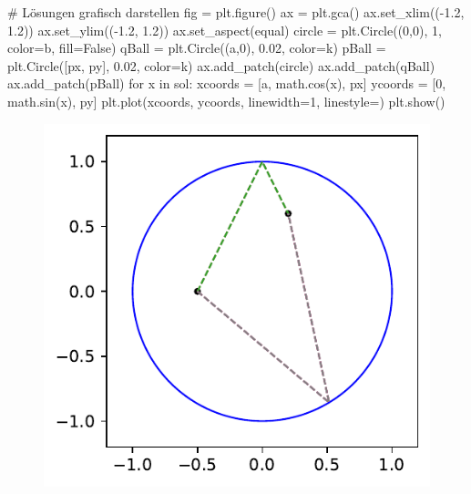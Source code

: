 \documentclass[
  letterpaper,
  DIV=11,
  oneside]{scrreprt}
\newenvironment{Shaded}{\begin{snugshade}}{\end{snugshade}}
\newcommand{\CommentTok}[1]{\textcolor[rgb]{0.37,0.37,0.37}{#1}}
\newcommand{\ControlFlowTok}[1]{\textcolor[rgb]{0.00,0.23,0.31}{#1}}
\newcommand{\DecValTok}[1]{\textcolor[rgb]{0.68,0.00,0.00}{#1}}
\newcommand{\FloatTok}[1]{\textcolor[rgb]{0.68,0.00,0.00}{#1}}
\newcommand{\KeywordTok}[1]{\textcolor[rgb]{0.00,0.23,0.31}{#1}}
\newcommand{\NormalTok}[1]{\textcolor[rgb]{0.00,0.23,0.31}{#1}}
\newcommand{\OperatorTok}[1]{\textcolor[rgb]{0.37,0.37,0.37}{#1}}
\newcommand{\StringTok}[1]{\textcolor[rgb]{0.13,0.47,0.30}{#1}}
\newcommand{\VariableTok}[1]{\textcolor[rgb]{0.07,0.07,0.07}{#1}}
\theoremstyle{definition}
\theoremstyle{definition}
\theoremstyle{remark}
\begin{document}
\begin{tcolorbox}
\begin{Shaded}
\begin{Highlighting}[]
    \CommentTok{\# Lösungen grafisch darstellen}
\NormalTok{    fig }\OperatorTok{=}\NormalTok{ plt.figure()}
\NormalTok{    ax }\OperatorTok{=}\NormalTok{ plt.gca()}
\NormalTok{    ax.set\_xlim((}\OperatorTok{{-}}\FloatTok{1.2}\NormalTok{, }\FloatTok{1.2}\NormalTok{))}
\NormalTok{    ax.set\_ylim((}\OperatorTok{{-}}\FloatTok{1.2}\NormalTok{, }\FloatTok{1.2}\NormalTok{))}
\NormalTok{    ax.set\_aspect(}\StringTok{\textquotesingle{}equal\textquotesingle{}}\NormalTok{)}
\NormalTok{    circle }\OperatorTok{=}\NormalTok{ plt.Circle((}\DecValTok{0}\NormalTok{,}\DecValTok{0}\NormalTok{), }\DecValTok{1}\NormalTok{, color}\OperatorTok{=}\StringTok{\textquotesingle{}b\textquotesingle{}}\NormalTok{, fill}\OperatorTok{=}\VariableTok{False}\NormalTok{)}
\NormalTok{    qBall }\OperatorTok{=}\NormalTok{ plt.Circle((a,}\DecValTok{0}\NormalTok{), }\FloatTok{0.02}\NormalTok{, color}\OperatorTok{=}\StringTok{\textquotesingle{}k\textquotesingle{}}\NormalTok{)}
\NormalTok{    pBall }\OperatorTok{=}\NormalTok{ plt.Circle([px, py], }\FloatTok{0.02}\NormalTok{, color}\OperatorTok{=}\StringTok{\textquotesingle{}k\textquotesingle{}}\NormalTok{)}
\NormalTok{    ax.add\_patch(circle)}
\NormalTok{    ax.add\_patch(qBall)}
\NormalTok{    ax.add\_patch(pBall)}
    \ControlFlowTok{for}\NormalTok{ x }\KeywordTok{in}\NormalTok{ sol:}
\NormalTok{        xcoords }\OperatorTok{=}\NormalTok{ [a, math.cos(x), px]}
\NormalTok{        ycoords }\OperatorTok{=}\NormalTok{ [}\DecValTok{0}\NormalTok{, math.sin(x), py]}
\NormalTok{        plt.plot(xcoords, ycoords, linewidth}\OperatorTok{=}\DecValTok{1}\NormalTok{, linestyle}\OperatorTok{=}\StringTok{\textquotesingle{}{-}{-}\textquotesingle{}}\NormalTok{)}
\NormalTok{    plt.show()}
\end{Highlighting}
\end{Shaded}

\begin{figure}[H]

{\centering \includegraphics{./ADOneDimManually_files/figure-pdf/fig-billardproblemsolutionwithmathsad-output-1.pdf}

}
\end{figure}
\end{tcolorbox}
\end{document}
